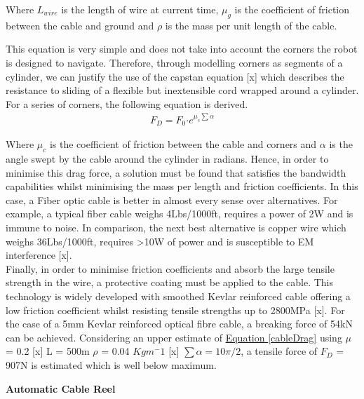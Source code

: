 \documentclass[11pt]{article}		%
\begin{document}
        Where $L_{wire}$ is the length of wire at current time, $\mu_g$ is the coefficient of friction between the cable and ground and $\rho$ is the mass per unit length of the cable.
        
        This equation is very simple and does not take into account the corners the robot is designed to navigate. 
        Therefore, through modelling corners as segments of a cylinder, we can justify the use of the capstan equation [x] which describes the resistance to sliding of a flexible but inextensible cord wrapped around a cylinder. 
        For a series of corners, the following equation is derived.
        \begin{align}
                F_D = F_0 \boldsymbol{\cdot} {e}^{\mu_c \sum \alpha} \label{cableDrag}
        \end{align}

		Where $\mu_c$ is the coefficient of friction between the cable and corners and $\alpha$ is the angle swept by the cable around the cylinder in radians. 
	    Hence, in order to minimise this drag force, a solution must be found that satisfies the bandwidth capabilities whilst minimising the mass per length and friction coefficients.  
	    In this case, a Fiber optic cable is better in almost every sense over alternatives. 
	    For example, a typical fiber cable weighs 4Lbs/1000ft, requires a power of 2W and is immune to noise. 
	    In comparison, the next best alternative is copper wire which weighs 36Lbs/1000ft, requires >10W of power and is susceptible to EM interference [x].
	    \\
	    Finally, in order to minimise friction coefficients and absorb the large tensile strength in the wire, a protective coating must be applied to the cable. 
	    This technology is widely developed with smoothed Kevlar reinforced cable offering a low friction coefficient whilst resisting tensile strengths up to 2800MPa [x]. For the case of a 5mm Kevlar reinforced optical fibre cable, a breaking force of 54kN can be achieved. 
	    Considering an upper estimate of \hyperref[cableDrag]{Equation \ref*{cableDrag}} using $\mu$ = 0.2 [x] L = 500m $\rho$ = 0.04 $Kgm^-1$ [x] $\sum \alpha = 10\pi/2$, a tensile force of $F_D$ = 907N is estimated which is well below maximum. 
	    
	    \textbf{Automatic Cable Reel}
\end{document}
